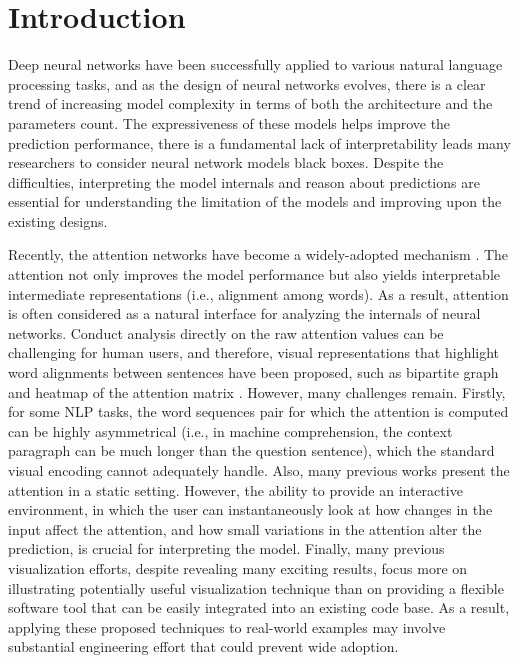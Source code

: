 \section{Introduction}

Deep neural networks have been successfully applied to various natural language processing tasks,
and as the design of neural networks evolves, there is a clear trend of increasing model complexity in terms of both the architecture and the parameters count. 
%
The expressiveness of these models helps improve the prediction performance, there is a fundamental lack of interpretability leads many researchers to consider neural network models black boxes. 
%
Despite the difficulties, interpreting the model internals and reason about predictions are essential for understanding the limitation of the models and improving upon the existing designs.


Recently, the attention networks have become a widely-adopted mechanism \cite{bahdanau2014neural,seo2016bidirectional,Parikh2016, VaswaniShazeerParmar2017}. The attention not only improves the model performance but also yields interpretable intermediate representations (i.e., alignment among words). As a result, attention is often considered as a natural interface for analyzing the internals of neural networks. Conduct analysis directly on the raw attention values can be challenging for human users, and therefore, visual representations that highlight word alignments between sentences have been proposed, such as bipartite graph and heatmap of the attention matrix \cite{LiChenHovy2015, li2016understanding, lee2017interactive}.  However, many challenges remain. Firstly, for some NLP tasks, the word sequences pair for which the attention is computed can be highly asymmetrical (i.e., in machine comprehension, the context paragraph can be much longer than the question sentence), which the standard visual encoding cannot adequately handle.  Also, many previous works present the attention in a static setting. However, the ability to provide an interactive environment, in which the user can instantaneously look at how changes in the input affect the attention, and how small variations in the attention alter the prediction, is crucial for interpreting the model. Finally, many previous visualization efforts, despite revealing many exciting results, focus more on illustrating potentially useful visualization technique than on providing a flexible software tool that can be easily integrated into an existing code base. As a result, applying these proposed techniques to real-world examples may involve substantial engineering effort that could prevent wide adoption.

